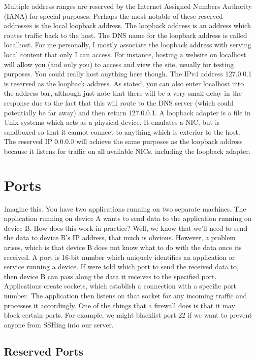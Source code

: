 \documentclass{article}
\begin{document}
Multiple address ranges are reserved by the Internet Assigned Numbers Authority (IANA) for special purposes.
Perhaps the most notable of these reserved addresses is the local loopback address. The loopback address is an
address which routes traffic back to the host. The DNS name for the loopback address is called localhost. For
me personally, I mostly associate the loopback address with serving local content that only I can access. For
instance, hosting a website on localhost will allow you (and only you) to access and view the site, usually
for testing purposes. You could really host anything here though. The IPv4 address 127.0.0.1 is reserved as
the loopback address. As stated, you can also enter localhost into the address bar, although just note that
there will be a very small delay in the response due to the fact that this will route to the DNS server (which
could potentially be far away) and then return 127.0.0.1. A loopback adapter is a file in Unix systems which
acts as a physical device. It emulates a NIC, but is sandboxed so that it cannot connect to anything which
is exterior to the host. The reserved IP 0.0.0.0 will achieve the same purposes as the loopback address because
it listens for traffic on all available NICs, including the loopback adapter.

\section{Ports}

Imagine this. You have two applications running on two separate machines. The application running on device A
wants to send data to the application running on device B. How does this work in practice? Well, we know that
we'll need to send the data to device B's IP address, that much is obvious. However, a problem arises, which is
that device B does not know what to do with the data once its received. A port is 16-bit number which uniquely
identifies an application or service running a device. If were told which port to send the received data to,
then device B can pass along the data it receives to the specified port. Applications create sockets, which
establish a connection with a specific port number. The application then listens on that socket for any
incoming traffic and processes it accordingly. One of the things that a firewall does is that it may block
certain ports. For example, we might blacklist port 22 if we want to prevent anyone from SSHing into our
server.

\subsection{Reserved Ports}
\end{document}
